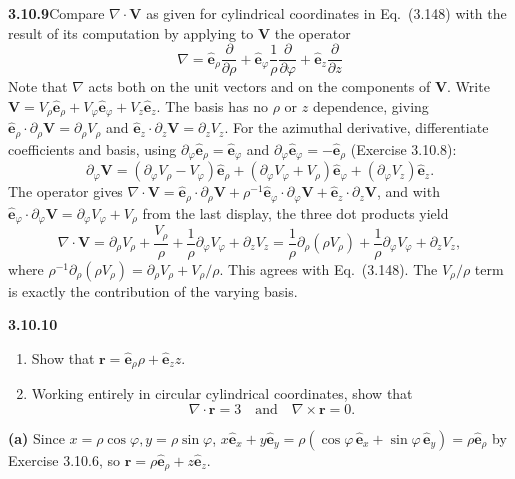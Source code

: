 \par\bigskip
\noindent\textbf{3.10.9}\quad Compare $\nabla\cdot\mathbf{V}$ as given for
cylindrical coordinates in Eq.~(3.148) with the result of its computation by
applying to $\mathbf{V}$ the operator
\[
\nabla=\hat{\mathbf{e}}_{\rho}\frac{\partial}{\partial\rho}
+\hat{\mathbf{e}}_{\varphi}\frac{1}{\rho}\frac{\partial}{\partial\varphi}
+\hat{\mathbf{e}}_{z}\frac{\partial}{\partial z}
\]
Note that $\nabla$ acts both on the unit vectors and on the components of
$\mathbf{V}$.
\solution
Write $\mathbf V=V_\rho\hat{\mathbf e}_\rho+
V_\varphi\hat{\mathbf e}_\varphi+V_z\hat{\mathbf e}_z$.
The basis has no $\rho$ or $z$ dependence, giving
$\hat{\mathbf e}_\rho\cdot\partial_\rho\mathbf V=\partial_\rho V_\rho$
and $\hat{\mathbf e}_z\cdot\partial_z\mathbf V=\partial_zV_z$.
For the azimuthal derivative, differentiate coefficients and basis,
using $\partial_\varphi\hat{\mathbf e}_\rho=\hat{\mathbf e}_\varphi$ and
$\partial_\varphi\hat{\mathbf e}_\varphi=-\hat{\mathbf e}_\rho$
(Exercise 3.10.8):
\[
\partial_\varphi\mathbf V
=(\partial_\varphi V_\rho-V_\varphi)\hat{\mathbf e}_\rho
+(\partial_\varphi V_\varphi+V_\rho)\hat{\mathbf e}_\varphi
+(\partial_\varphi V_z)\hat{\mathbf e}_z.
\]
The operator gives
$\nabla\cdot\mathbf V=\hat{\mathbf e}_\rho\cdot\partial_\rho\mathbf V
+\rho^{-1}\hat{\mathbf e}_\varphi\cdot\partial_\varphi\mathbf V
+\hat{\mathbf e}_z\cdot\partial_z\mathbf V$, and with
$\hat{\mathbf e}_\varphi\cdot\partial_\varphi\mathbf V
=\partial_\varphi V_\varphi+V_\rho$ from the last display, the three
dot products yield
\[
\boxed{\nabla\cdot\mathbf V
=\partial_\rho V_\rho+\frac{V_\rho}{\rho}
+\frac1\rho\partial_\varphi V_\varphi+\partial_zV_z
=\frac1\rho\partial_\rho(\rho V_\rho)
+\frac1\rho\partial_\varphi V_\varphi+\partial_zV_z},
\]
where $\rho^{-1}\partial_\rho(\rho V_\rho)=\partial_\rho V_\rho+V_\rho/\rho$.
This agrees with Eq.~(3.148).
The $V_\rho/\rho$ term is exactly the contribution of the varying basis.


\par\bigskip
\noindent\textbf{3.10.10}\quad
\begin{enumerate}
\item[(a)] Show that
  $\mathbf{r}=\hat{\mathbf{e}}_{\rho}\rho+\hat{\mathbf{e}}_{z}z$.
\item[(b)] Working entirely in circular cylindrical coordinates, show that
  \[
  \nabla\cdot\mathbf{r}=3\quad\text{and}\quad\nabla\times\mathbf{r}=0.
  \]
\end{enumerate}
\solution
\textbf{(a)} Since $x=\rho\cos\varphi,y=\rho\sin\varphi$,
$x\hat{\mathbf e}_x+y\hat{\mathbf e}_y
=\rho(\cos\varphi\,\hat{\mathbf e}_x+\sin\varphi\,\hat{\mathbf e}_y)
=\rho\hat{\mathbf e}_\rho$ by Exercise 3.10.6,
so $\mathbf r=\rho\hat{\mathbf e}_\rho+z\hat{\mathbf e}_z$.

